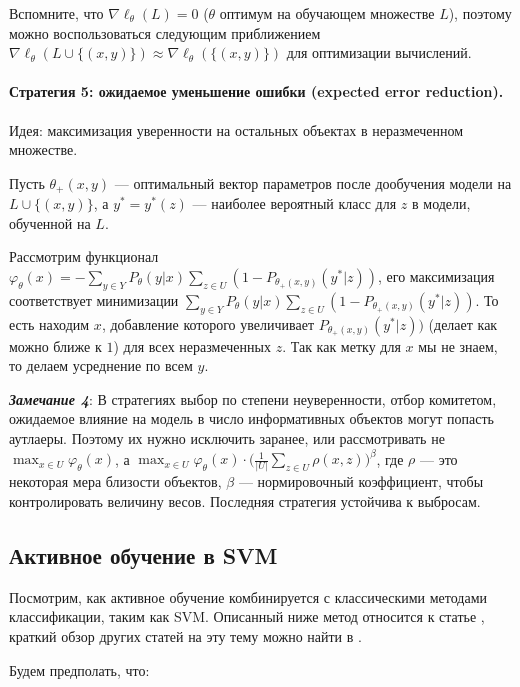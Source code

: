 \documentclass[specialist, 12pt, href]{article}
\begin{document}
Вспомните, что \(\nabla\ell_{\theta}(L) = 0\) (\(\theta\) оптимум на
обучающем множестве \(L\)), поэтому можно воспользоваться следующим
приближением
\(\nabla\ell_{\theta}(L \cup \{(x, y)\}) \approx \nabla\ell_{\theta}(\{(x, y)\})\)
для оптимизации вычислений.

\paragraph{Стратегия 5: ожидаемое уменьшение ошибки (expected error
reduction).}

Идея: максимизация уверенности на остальных объектах в неразмеченном
множестве.

Пусть \(\theta_+(x, y)\) --- оптимальный вектор параметров после
дообучения модели на \(L \cup \{(x, y)\}\), а \(y^* = y^*(z)\) ---
наиболее вероятный класс для \(z\) в модели, обученной на \(L\).

Рассмотрим функционал
\(\varphi_{\theta}(x) = - \sum_{y \in Y} P_{\theta}(y|x) \sum_{z \in U} (1 - P_{\theta_+(x, y)}(y^*|z))\),
его максимизация соответствует минимизации
\(\sum_{y \in Y} P_{\theta}(y|x) \sum_{z \in U} (1 - P_{\theta_+(x, y)}(y^*|z))\).
То есть находим \(x\), добавление которого увеличивает
\(P_{\theta_+(x, y)}(y^*|z))\) (делает как можно ближе к \(1\)) для всех
неразмеченных \(z\). Так как метку для \(x\) мы не знаем, то делаем
усреднение по всем \(y\).

\emph{\textbf{Замечание 4}}: В стратегиях выбор по степени неуверенности,
отбор комитетом, ожидаемое влияние на модель в число информативных
объектов могут попасть аутлаеры. Поэтому их нужно исключить заранее, или
рассмотривать не \(\max_{x \in U} \varphi_{\theta}(x)\), а
\(\max_{x \in U} \varphi_{\theta}(x)\cdot \big(\frac{1}{|U|}\sum_{z \in U}\rho(x, z)\big)^{\beta}\),
где \(\rho\) --- это некоторая мера близости объектов, \(\beta\) ---
нормировочный коэффициент, чтобы контролировать величину весов.
Последняя стратегия устойчива к выбросам.

\subsection{Активное обучение в
SVM}

Посмотрим, как активное обучение комбинируется с классическими методами
классификации, таким как SVM. Описанный ниже метод относится к статье
\cite{TongKoller}, краткий обзор других статей на эту тему можно
найти в \cite{Settles}.

Будем предполать, что:
\end{document}
